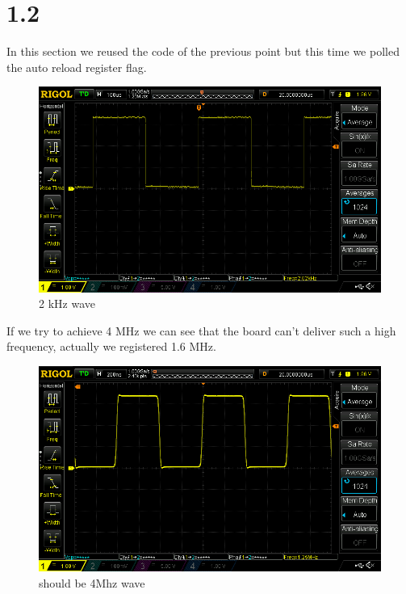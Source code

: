 \documentclass[12pt]{article}
\begin{document}
\section*{1.2 }
In this section we reused the code of the previous point but this time we polled the auto reload register flag.\\
\begin{figure}[h!]
	
	\includegraphics[scale = 0.4]{immagini/DS1Z_QuickPrint4}
	\caption{2 kHz wave }
\end{figure}
If we try to achieve 4 MHz we can see that the board can't deliver such a high frequency, actually we registered 1.6 MHz. 
\begin{figure}[h!]
	
	\includegraphics[scale = 0.4]{immagini/DS1Z_QuickPrint3}
	\caption{should be 4Mhz wave }
\end{figure}
\end{document}
